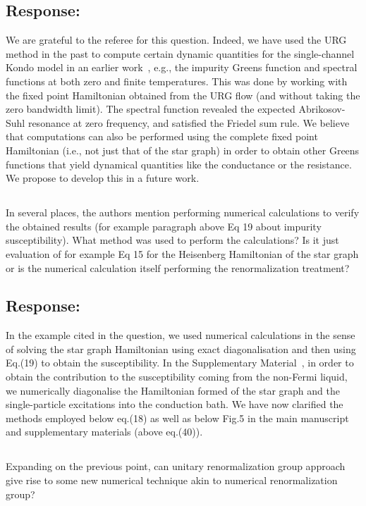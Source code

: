\documentclass{article}
\newcommand{\response}[1]{{\color{blue}\subsection*{Response:}{#1}}}
\newcommand{\point}[1]{\subsection{}{#1}}
\begin{document}
\response{ We are grateful to the referee for this question. Indeed, we have used the URG method in the past to compute certain dynamic quantities for the single-channel Kondo model in an earlier work~\cite{kondo_urg}, e.g., the impurity Greens function and spectral functions at both zero and finite temperatures. This was done by working with the fixed point Hamiltonian obtained from the URG flow (and without taking the zero bandwidth limit). The spectral function revealed the expected Abrikosov-Suhl resonance at zero frequency, and satisfied the Friedel sum rule. We believe that computations can also be performed using the complete fixed point Hamiltonian (i.e., not just that of the star graph) in order to obtain other Greens functions that yield dynamical quantities like the conductance or the resistance. We propose to develop this in a future work.}

\point{
In several places, the authors mention performing numerical calculations to verify the obtained results (for example paragraph above Eq 19 about impurity susceptibility). What method was used to perform the calculations? Is it just evaluation of for example Eq 15 for the Heisenberg Hamiltonian of the star graph or is the numerical calculation itself performing the renormalization treatment?}

\response{ In the example cited in the question, we used numerical calculations in the sense of solving the star graph Hamiltonian using exact diagonalisation and then using Eq.(19) to obtain the susceptibility. In the Supplementary Material~\cite{SM}, in order to obtain the contribution to the susceptibility coming from the non-Fermi liquid, we numerically diagonalise the Hamiltonian formed of the star graph and the single-particle excitations into the conduction bath. We have now clarified the methods employed below eq.(18) as well as below Fig.5 in the main manuscript and supplementary materials (above eq.(40)).}

\point{
Expanding on the previous point, can unitary renormalization group approach give rise to some new numerical technique akin to numerical renormalization group?}
\end{document}
